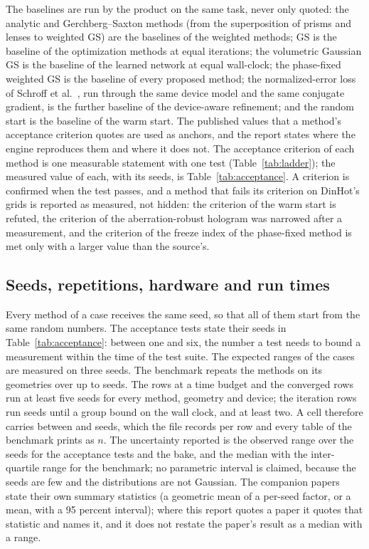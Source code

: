 The baselines are run by the product on the same task, never only quoted: the analytic and Gerchberg--Saxton methods (from the superposition of prisms and lenses to weighted GS) are the baselines of the weighted methods; GS is the baseline of the optimization methods at equal iterations; the volumetric Gaussian GS is the baseline of the learned network at equal wall-clock; the phase-fixed weighted GS is the baseline of every proposed method; the normalized-error loss of Schroff et al.~\cite{schroff}, run through the same device model and the same conjugate gradient, is the further baseline of the device-aware refinement; and the random start is the baseline of the warm start. The published values that a method's acceptance criterion quotes are used as anchors, and the report states where the engine reproduces them and where it does not. The acceptance criterion of each method is one measurable statement with one test (Table~\ref{tab:ladder}); the measured value of each, with its seeds, is Table~\ref{tab:acceptance}. A criterion is confirmed when the test passes, and a method that fails its criterion on DinHot's grids is reported as measured, not hidden: the criterion of the warm start is refuted, the criterion of the aberration-robust hologram was narrowed after a measurement, and the criterion of the freeze index of the phase-fixed method is met only with a larger value than the source's.




\subsection{Seeds, repetitions, hardware and run times}\label{sec:protocol-hw}

Every method of a case receives the same seed, so that all of them start from the same random numbers. The acceptance tests state their seeds in Table~\ref{tab:acceptance}: between one and six, the number a test needs to bound a measurement within the time of the test suite. The expected ranges of the cases are measured on three seeds. The benchmark repeats the methods on its geometries over up to \benchSeeds{} seeds. The rows at a time budget and the converged rows run at least five seeds for every method, geometry and device; the iteration rows run seeds until a group bound on the wall clock, and at least two. A cell therefore carries between \benchSeedsMin{} and \benchSeedsMax{} seeds, which the file records per row and every table of the benchmark prints as $n$. The uncertainty reported is the observed range over the seeds for the acceptance tests and the bake, and the median with the inter-quartile range for the benchmark; no parametric interval is claimed, because the seeds are few and the distributions are not Gaussian. The companion papers state their own summary statistics (a geometric mean of a per-seed factor, or a mean, with a 95 percent interval); where this report quotes a paper it quotes that statistic and names it, and it does not restate the paper's result as a median with a range.

